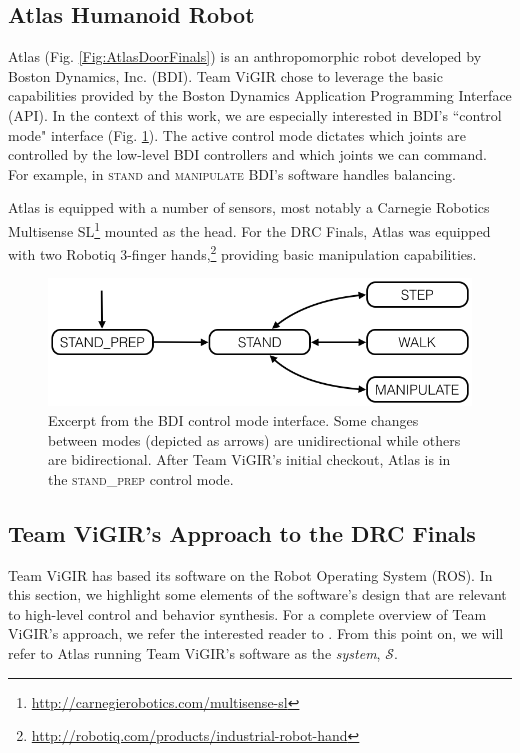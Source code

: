 
\subsection{Atlas Humanoid Robot}

Atlas (Fig. \ref{Fig:AtlasDoorFinals}) is an anthropomorphic robot developed by Boston Dynamics, Inc. (BDI). 
Team ViGIR chose to leverage the basic capabilities provided by the Boston Dynamics Application Programming Interface (API).
In the context of this work, we are especially interested in BDI's ``control mode" interface (Fig. \ref{Fig:ControlModeTS}).
The active control mode dictates which joints are controlled by the low-level BDI controllers and which joints we can command.
For example, in \textsc{stand} and \textsc{manipulate} BDI's software handles balancing.

Atlas is equipped with a number of sensors, most notably a Carnegie Robotics Multisense SL\footnote{\scriptsize{\url{http://carnegierobotics.com/multisense-sl}}} mounted as the head.
For the DRC Finals, Atlas was equipped with two Robotiq 3-finger hands,\footnote{\scriptsize{\url{http://robotiq.com/products/industrial-robot-hand}}} providing basic manipulation capabilities.

\begin{figure}[t]
\centering
\includegraphics[width=0.99\columnwidth,clip]{./img/control_modes_ts.png}
\caption{Excerpt from the BDI control mode interface.
Some changes between modes (depicted as arrows) are unidirectional while others are bidirectional.
After Team ViGIR's initial checkout, Atlas is in the \textsc{stand\_prep} control mode.
}
\label{Fig:ControlModeTS}
\end{figure}

\subsection{Team ViGIR's Approach to the DRC Finals}\label{S:TeamViGIR}

Team ViGIR has based its software on the Robot Operating System (ROS).
In this section, we highlight some elements of the software's design that are relevant to high-level control and behavior synthesis.
For a complete overview of Team ViGIR's approach, we refer the interested reader to \cite{TeamViGIR2014JFR}.
From this point on, we will refer to Atlas running Team ViGIR's software as the \emph{system}, $\mathcal{S}$.

